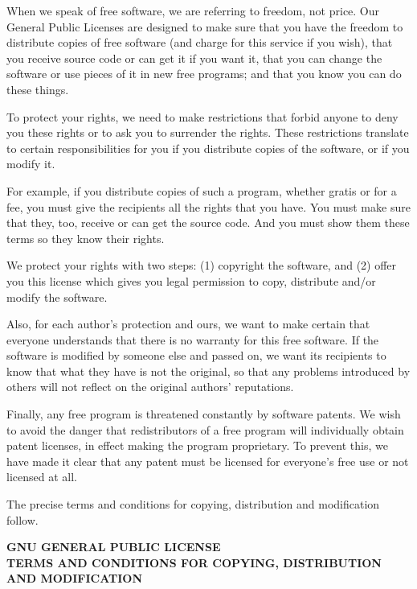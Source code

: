 When we speak of free software, we are referring to freedom, not
price.  Our General Public Licenses are designed to make sure that you
have the freedom to distribute copies of free software (and charge for
this service if you wish), that you receive source code or can get it
if you want it, that you can change the software or use pieces of it
in new free programs; and that you know you can do these things.

To protect your rights, we need to make restrictions that forbid
anyone to deny you these rights or to ask you to surrender the rights.
These restrictions translate to certain responsibilities for you if you
distribute copies of the software, or if you modify it.

For example, if you distribute copies of such a program, whether
gratis or for a fee, you must give the recipients all the rights that
you have.  You must make sure that they, too, receive or can get the
source code.  And you must show them these terms so they know their
rights.

We protect your rights with two steps: (1) copyright the software, and
(2) offer you this license which gives you legal permission to copy,
distribute and/or modify the software.

Also, for each author's protection and ours, we want to make certain
that everyone understands that there is no warranty for this free
software.  If the software is modified by someone else and passed on, we
want its recipients to know that what they have is not the original, so
that any problems introduced by others will not reflect on the original
authors' reputations.

Finally, any free program is threatened constantly by software
patents.  We wish to avoid the danger that redistributors of a free
program will individually obtain patent licenses, in effect making the
program proprietary.  To prevent this, we have made it clear that any
patent must be licensed for everyone's free use or not licensed at all.

The precise terms and conditions for copying, distribution and
modification follow.

\begin{center}
{\bf GNU GENERAL PUBLIC LICENSE } \\
{\bf TERMS AND CONDITIONS FOR COPYING, DISTRIBUTION AND MODIFICATION}
\end{center}

